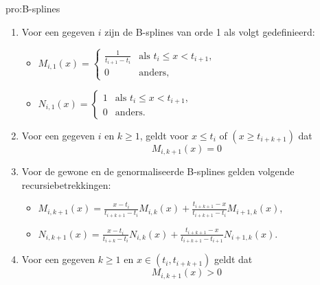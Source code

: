\begin{pro}[B-splines]{pro:B-splines}
    \begin{enumerate}
        \item 
            Voor een gegeven $i$ zijn de B-splines van orde 1 als volgt gedefinieerd:
            \begin{itemize}
                \item $M_{i,1}(x) = \begin{cases}
                    \frac{1}{t_{i+1}-t_i} & \text{als } t_i \leq x < t_{i+1}, \\
                    0 & \text{anders},
                \end{cases}$
                \item $N_{i,1}(x) = \begin{cases}
                    1 & \text{als } t_i \leq x < t_{i+1}, \\
                    0 & \text{anders}.
                \end{cases}$
            \end{itemize}
        \item 
            Voor een gegeven $i$ en $k\geq 1$, geldt voor $x \leq t_i$ of $(x \geq t_{i+k+1})$ dat
            \begin{equation*}
            M_{i,k+1}(x) = 0
            \end{equation*}
        \item 
            Voor de gewone en de genormaliseerde B-splines gelden volgende recursiebetrekkingen:
            \begin{itemize}
                \item $M_{i,k+1}(x) = \frac{x-t_i}{t_{i+k+1}-t_i} M_{i,k}(x) + \frac{t_{i+k+1}-x}{t_{i+k+1}-t_{i}} M_{i+1,k}(x)$,
                \item $N_{i,k+1}(x) = \frac{x-t_i}{t_{i+k}-t_i} N_{i,k}(x) + \frac{t_{i+k+1}-x}{t_{i+k+1}-t_{i+1}} N_{i+1,k}(x)$.
            \end{itemize}
        \item 
            Voor een gegeven $k\geq 1$ en $x \in (t_i,t_{i+k+1})$ geldt dat
            \begin{equation*}
                M_{i,k+1}(x) > 0
            \end{equation*}
    \end{enumerate}
\end{pro}

